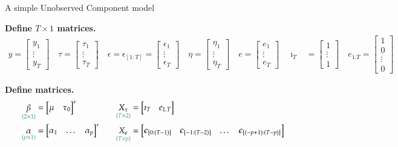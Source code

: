 \documentclass[notes,blackandwhite,mathsans,usenames,dvipsnames]{beamer}
\begin{document}
\begin{frame}{A simple Unobserved Component model}

\smallskip\textbf{Define $T\times1$ matrices.}\scriptsize
\begin{align*}
y=\begin{bmatrix}y_1\\ \vdots \\ y_T\end{bmatrix}\quad
\tau=\begin{bmatrix}\tau_1\\ \vdots \\ \tau_T\end{bmatrix}\quad
\epsilon=\epsilon_{[1:T]}=\begin{bmatrix}\epsilon_1\\ \vdots \\ \epsilon_T\end{bmatrix}\quad
\eta=\begin{bmatrix}\eta_1\\ \vdots \\ \eta_T\end{bmatrix}\quad
e=\begin{bmatrix}e_1\\ \vdots \\ e_T\end{bmatrix}\quad
\imath_T &=\begin{bmatrix}1\\ \vdots \\ 1\end{bmatrix}\quad
e_{1.T}=\begin{bmatrix}1 \\ 0 \\ \vdots \\ 0\end{bmatrix}
\end{align*}

\normalsize\smallskip\textbf{Define matrices.}\scriptsize
\begin{align*}
\underset{\color{mcxs2}(2\times1)}{\beta}&=\begin{bmatrix} \mu&\tau_0\end{bmatrix}'\quad 
&\underset{\color{mcxs2}(T\times2)}{X_\tau}&=\begin{bmatrix} \imath_T&e_{1.T}\end{bmatrix}\\
\underset{\color{mcxs2}(p\times1)}{\alpha}&=\begin{bmatrix} \alpha_1&\dots&\alpha_p\end{bmatrix}'\quad
&\underset{\color{mcxs2}(T\times p)}{X_\epsilon}&=\begin{bmatrix} \epsilon_{[0:(T-1)]}& \epsilon_{[-1:(T-2)]}&\dots&\epsilon_{[(-p+1):(T-p)]}\end{bmatrix}\quad
\end{align*}



\end{frame}
\end{document}
